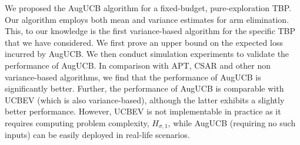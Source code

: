 We proposed the AugUCB algorithm for a fixed-budget, pure-exploration TBP. Our algorithm employs both mean and variance estimates for arm elimination. This, to our knowledge is the first variance-based algorithm for the specific TBP that we have considered. We first prove an upper bound on the expected loss incurred by AugUCB. We then conduct simulation experiments to validate the performance of AugUCB. In comparison with APT, CSAR and other non variance-based algorithms, we find that the performance of AugUCB is significantly better. Further, the performance of AugUCB is comparable with UCBEV (which is also variance-based), although the latter exhibits a slightly better performance.  However, UCBEV is not implementable in practice as it requires computing problem complexity, $H_{\sigma,1}$, while AugUCB (requiring no such inputs) can be easily deployed in real-life scenarios. 



